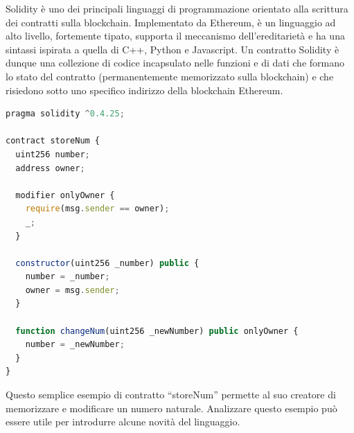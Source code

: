 Solidity è uno dei principali linguaggi di programmazione orientato alla scrittura dei contratti sulla blockchain. Implementato da Ethereum, è un linguaggio ad alto livello, fortemente tipato, supporta il meccanismo dell'ereditarietà e ha una sintassi ispirata a quella di C++, Python e Javascript.
Un contratto Solidity è dunque una collezione di codice incapsulato nelle funzioni e di dati che formano lo stato del contratto (permanentemente memorizzato sulla blockchain) e che risiedono sotto uno specifico indirizzo della blockchain Ethereum.
\\
\begin{lstlisting}[caption={Esempio contratto Solidity},language=JavaScript]
pragma solidity ^0.4.25;

contract storeNum {
  uint256 number;
  address owner;

  modifier onlyOwner { 
    require(msg.sender == owner);
    _;
  }
  
  constructor(uint256 _number) public {
    number = _number;
    owner = msg.sender;
  }

  function changeNum(uint256 _newNumber) public onlyOwner {
    number = _newNumber;
  }
}
\end{lstlisting}

Questo semplice esempio di contratto “storeNum” permette al suo creatore di memorizzare e modificare un numero naturale. Analizzare questo esempio può essere utile per introdurre alcune novità del linguaggio.

